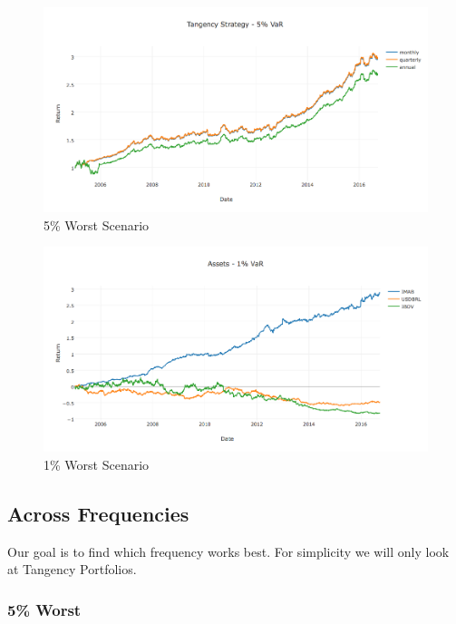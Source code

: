 \documentclass[paper=a4, fontsize=11pt]{scrartcl} %
\numberwithin{equation}{section} %
\numberwithin{figure}{section} %
\numberwithin{table}{section} %
\begin{document}
\begin{figure}[H]
  \includegraphics[width=\linewidth]{5Var.png}
  \caption{5\% Worst Scenario}
  \label{fig:5Var}
\end{figure}

\begin{figure}[H]
  \includegraphics[width=\linewidth]{1Var.png}
  \caption{1\% Worst Scenario}
  \label{fig:1Var}
\end{figure}

\subsection{Across Frequencies}

Our goal is to find which frequency works best. For simplicity we will only look at Tangency Portfolios.

\subsubsection{5\% Worst}
\end{document}
